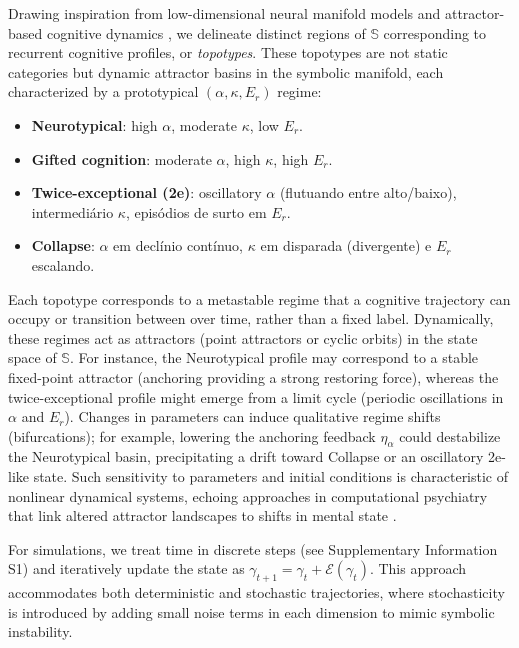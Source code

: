 Drawing inspiration from low-dimensional neural manifold models \cite{langdon2023, sizemore2019, rouse2023} and attractor-based cognitive dynamics \cite{helmich2021, rolls2021}, we delineate distinct regions of $\mathbb{S}$ corresponding to recurrent cognitive profiles, or \textit{topotypes}. These topotypes are not static categories but dynamic attractor basins in the symbolic manifold, each characterized by a prototypical $(\alpha, \kappa, E_r)$ regime:
\begin{itemize}
    \item \textbf{Neurotypical}: high $\alpha$, moderate $\kappa$, low $E_r$.
    \item \textbf{Gifted cognition}: moderate $\alpha$, high $\kappa$, high $E_r$.
    \item \textbf{Twice-exceptional (2e)}: oscillatory $\alpha$ (flutuando entre alto/baixo), intermediário $\kappa$, episódios de surto em $E_r$.
    \item \textbf{Collapse}: $\alpha$ em declínio contínuo, $\kappa$ em disparada (divergente) e $E_r$ escalando.
\end{itemize}

Each topotype corresponds to a metastable regime that a cognitive trajectory can occupy or transition between over time, rather than a fixed label. Dynamically, these regimes act as attractors (point attractors or cyclic orbits) in the state space of $\mathbb{S}$. For instance, the Neurotypical profile may correspond to a stable fixed-point attractor (anchoring providing a strong restoring force), whereas the twice-exceptional profile might emerge from a limit cycle (periodic oscillations in $\alpha$ and $E_r$). Changes in parameters can induce qualitative regime shifts (bifurcations); for example, lowering the anchoring feedback $\eta_\alpha$ could destabilize the Neurotypical basin, precipitating a drift toward Collapse or an oscillatory 2e-like state. Such sensitivity to parameters and initial conditions is characteristic of nonlinear dynamical systems, echoing approaches in computational psychiatry that link altered attractor landscapes to shifts in mental state \cite{vandeleemput2014, gauld2023}. %

For simulations, we treat time in discrete steps (see Supplementary Information S1) and iteratively update the state as $\gamma_{t+1} = \gamma_t + \mathcal{E}(\gamma_t)$. This approach accommodates both deterministic and stochastic trajectories, where stochasticity is introduced by adding small noise terms in each dimension to mimic symbolic instability.


